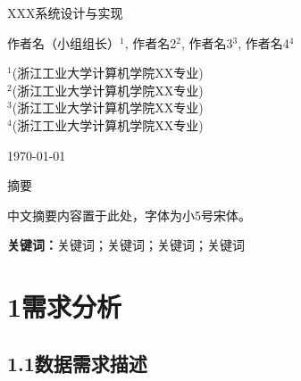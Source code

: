\documentclass{zjut-report}
\begin{document}


\begin{titlepage}
\begin{center}
{\fontsize{36pt}{43pt}\selectfont\heiti XXX系统设计与实现}

\vspace{2cm}

{\fontsize{16pt}{19pt}\selectfont{} 作者名（小组组长）$^1$, 作者名2$^2$, 作者名3$^3$, 作者名4$^4$}

\vspace{1cm}

{\fontsize{8pt}{10pt}\selectfont\songti
$^1$(浙江工业大学计算机学院XX专业)\\
$^2$(浙江工业大学计算机学院XX专业)\\
$^3$(浙江工业大学计算机学院XX专业)\\
$^4$(浙江工业大学计算机学院XX专业)
}

\vfill
{\large \today}
\end{center}
\end{titlepage}

\newpage
\begin{center}
{\fontsize{12pt}{15pt}\selectfont\heiti 摘\quad 要}
\end{center}

\vspace{1cm}

{\fontsize{9pt}{11pt}\selectfont\songti
中文摘要内容置于此处，字体为小5号宋体。
}

\vspace{1cm}

{\fontsize{9pt}{11pt}\selectfont\songti
\textbf{关键词：}关键词；关键词；关键词；关键词
}

\tableofcontents
\newpage

\chapter{1\quad 需求分析}

\section{1.1\quad 数据需求描述}
\end{document}
